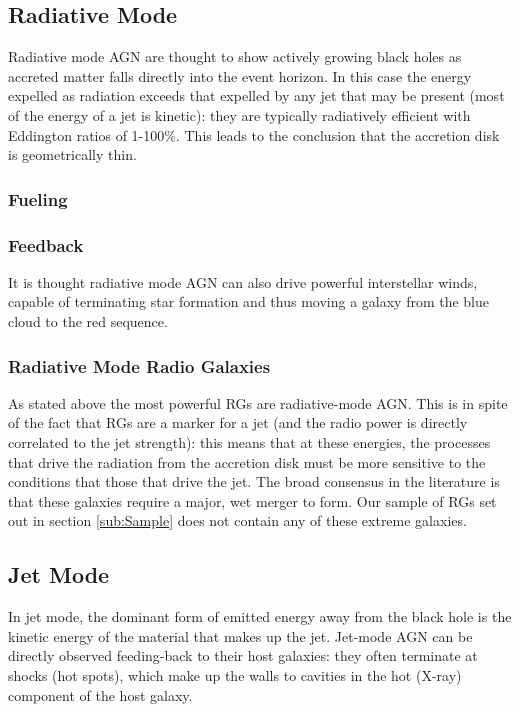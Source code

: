 	\subsection{Radiative Mode}
		\label{subsec:Radiative}
		Radiative mode AGN are thought to show actively growing black holes as accreted matter falls directly into the event horizon. In this case the energy expelled as radiation exceeds that expelled by any jet that may be present (most of the energy of a jet is kinetic): they are typically radiatively efficient with Eddington ratios of 1-100\%. This leads to the conclusion that the accretion disk is geometrically thin. 

		\subsubsection{Fueling}
			\label{subsubsec:RadiativeFueling}






		\subsubsection{Feedback}
			\label{subsubsec:RadiativeFeedback}
			It is thought radiative mode AGN can also drive powerful interstellar winds, capable of terminating star formation and thus moving a galaxy from the blue cloud to the red sequence. 

		\subsubsection{Radiative Mode Radio Galaxies}
			\label{subsubsec:RadiativeRadio}
			As stated above the most powerful RGs are radiative-mode AGN. This is in spite of the fact that RGs are a marker for a jet (and the radio power is directly correlated to the jet strength): this means that at these energies, the processes that drive the radiation from the accretion disk must be more sensitive to the conditions that those that drive the jet. The broad consensus in the literature is that these galaxies require a major, wet merger to form. Our sample of RGs set out in section \ref{sub:Sample} does not contain any of these extreme galaxies.

	\subsection{Jet Mode}
		\label{subsec:Jet}
		In jet mode, the dominant form of emitted energy away from the black hole is the kinetic energy of the material that makes up the jet. Jet-mode AGN can be directly observed feeding-back to their host galaxies: they often terminate at shocks (hot spots), which make up the walls to cavities in the hot (X-ray) component of the host galaxy.

